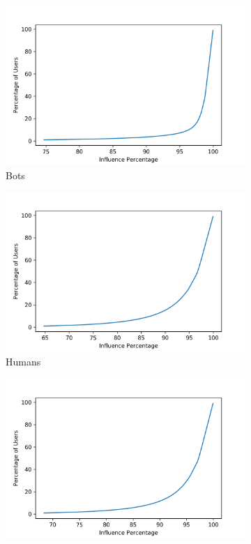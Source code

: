 \documentclass[letterpaper]{article}
\begin{document}
\begin{figure}
    \centering
    \captionsetup{justification=centering}

    \begin{subfigure}[b]{0.4\linewidth}
      \includegraphics[width=\linewidth]{images/top_1per_bots.png}
      \caption{Bots}
    \end{subfigure}
    \begin{subfigure}[b]{0.4\linewidth}
      \includegraphics[width=\linewidth]{images/top_1per_humans.png}
      \caption{Humans}
    \end{subfigure}
    \begin{subfigure}[b]{0.8\linewidth}
        \includegraphics[width=\linewidth]{images/top_1per_all.png}

\end{subfigure}
\end{figure}
\end{document}
